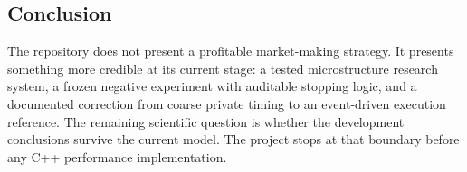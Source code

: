 \enlargethispage{4\baselineskip}
\subsection{Conclusion}

The repository does not present a profitable market-making strategy. It
presents something more credible at its current stage: a tested microstructure
research system, a frozen negative experiment with auditable stopping logic,
and a documented correction from coarse private timing to an event-driven
execution reference. The remaining scientific question is whether the
development conclusions survive the current model. The project stops at
that boundary before any C++ performance implementation.
